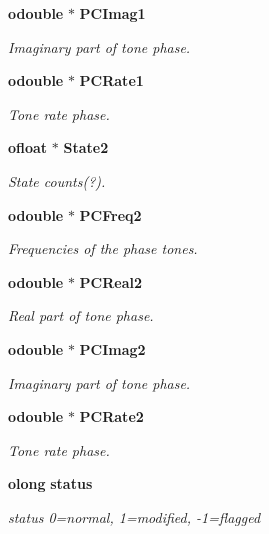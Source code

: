 \begin{CompactItemize}
{\bf odouble} $\ast$ {\bf PCImag1}
\begin{CompactList}\small\item\em Imaginary part of tone phase. \item\end{CompactList}\item 
{\bf odouble} $\ast$ {\bf PCRate1}
\begin{CompactList}\small\item\em Tone rate phase. \item\end{CompactList}\item 
{\bf ofloat} $\ast$ {\bf State2}
\begin{CompactList}\small\item\em State counts(?). \item\end{CompactList}\item 
{\bf odouble} $\ast$ {\bf PCFreq2}
\begin{CompactList}\small\item\em Frequencies of the phase tones. \item\end{CompactList}\item 
{\bf odouble} $\ast$ {\bf PCReal2}
\begin{CompactList}\small\item\em Real part of tone phase. \item\end{CompactList}\item 
{\bf odouble} $\ast$ {\bf PCImag2}
\begin{CompactList}\small\item\em Imaginary part of tone phase. \item\end{CompactList}\item 
{\bf odouble} $\ast$ {\bf PCRate2}
\begin{CompactList}\small\item\em Tone rate phase. \item\end{CompactList}\item 
{\bf olong} {\bf status}
\begin{CompactList}\small\item\em status 0=normal, 1=modified, -1=flagged \item\end{CompactList}\end{CompactItemize}


